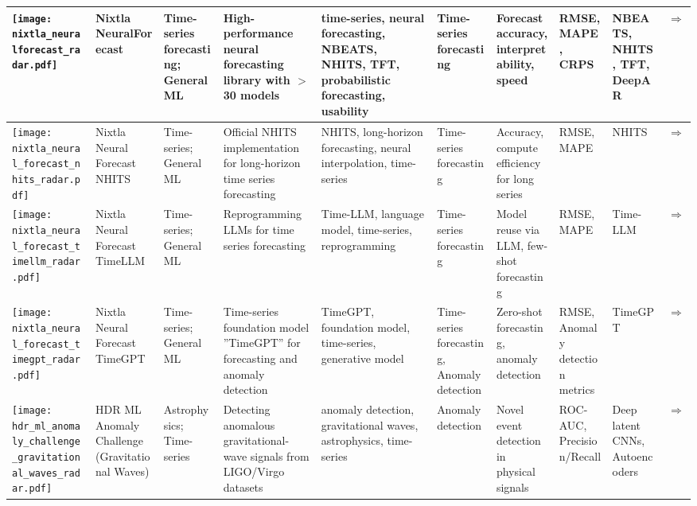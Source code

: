 \begin{landscape}
{\begin{longtable}{|p{}|p{}|p{}|p{}|p{}|p{}|p{}|p{}|p{}|p{}|}
\texttt{[image: nixtla\_neuralforecast\_radar.pdf]} & Nixtla NeuralForecast & Time-series forecasting; General ML & High-performance neural forecasting library with \ensuremath{>}30 models & time-series, neural forecasting, NBEATS, NHITS, TFT, probabilistic forecasting, usability & Time-series forecasting & Forecast accuracy, interpretability, speed & RMSE, MAPE, CRPS & NBEATS, NHITS, TFT, DeepAR & \cite{olivares2022library_neuralforecast}\href{https://github.com/Nixtla/neuralforecast}{$\Rightarrow$} \\ \hline
\texttt{[image: nixtla\_neural\_forecast\_nhits\_radar.pdf]} & Nixtla Neural Forecast NHITS & Time-series; General ML & Official NHITS implementation for long-horizon time series forecasting & NHITS, long-horizon forecasting, neural interpolation, time-series & Time-series forecasting & Accuracy, compute efficiency for long series & RMSE, MAPE & NHITS & \cite{challu2023nhits}\href{https://github.com/Nixtla/neuralforecast}{$\Rightarrow$} \\ \hline
\texttt{[image: nixtla\_neural\_forecast\_timellm\_radar.pdf]} & Nixtla Neural Forecast TimeLLM & Time-series; General ML & Reprogramming LLMs for time series forecasting & Time-LLM, language model, time-series, reprogramming & Time-series forecasting & Model reuse via LLM, few-shot forecasting & RMSE, MAPE & Time-LLM & \cite{jin2024timellmtimeseriesforecasting}\href{https://github.com/Nixtla/neuralforecast}{$\Rightarrow$} \\ \hline
\texttt{[image: nixtla\_neural\_forecast\_timegpt\_radar.pdf]} & Nixtla Neural Forecast TimeGPT & Time-series; General ML & Time-series foundation model ''TimeGPT'' for forecasting and anomaly detection & TimeGPT, foundation model, time-series, generative model & Time-series forecasting, Anomaly detection & Zero-shot forecasting, anomaly detection & RMSE, Anomaly detection metrics & TimeGPT & \cite{garza2024timegpt1}\href{https://github.com/Nixtla/neuralforecast}{$\Rightarrow$} \\ \hline
\texttt{[image: hdr\_ml\_anomaly\_challenge\_gravitational\_waves\_radar.pdf]} & HDR ML Anomaly Challenge (Gravitational Waves) & Astrophysics; Time-series & Detecting anomalous gravitational-wave signals from LIGO/Virgo datasets & anomaly detection, gravitational waves, astrophysics, time-series & Anomaly detection & Novel event detection in physical signals & ROC-AUC, Precision/Recall & Deep latent CNNs, Autoencoders & \cite{campolongo2025buildingmachinelearningchallenges}\href{https://www.codabench.org/competitions/2626/}{$\Rightarrow$} \\ \hline

\end{longtable}}
\end{landscape}
